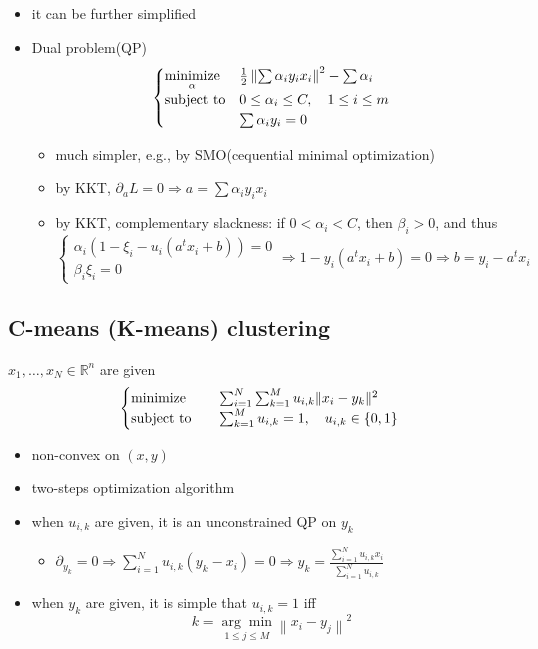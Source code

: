 \begin{remark}
\begin{itemize}
        \item it can be further simplified
        \item Dual problem(QP)\[\begin{cases}
            \underset{\alpha}{\operatorname{minimize}} & \frac{1}{2}\left\|\sum \alpha_{i} y_{i} x_{i}\right\|^{2}-\sum \alpha_{i} \\
            \operatorname{subject\ to} & 0 \leq \alpha_{i} \leq C, \quad 1 \leq i \leq m \\
            & \sum \alpha_{i} y_{i}=0
        \end{cases}\]\begin{itemize}
            \item much simpler, e.g., by SMO(cequential minimal optimization)
            \item by KKT, $\partial_aL = 0 \Longrightarrow a = \sum \alpha_iy_ix_i$
            \item by KKT, complementary slackness: if $0 < \alpha_i < C$, then $\beta_i > 0$, and thus \[\begin{cases}
                \alpha_i(1 - \xi_i - u_i(a^tx_i + b)) = 0\\
                \beta_i\xi_i = 0
            \end{cases} \Longrightarrow 1-y_{i}\left(a^{t} x_{i}+b\right)=0 \Longrightarrow b=y_{i}-a^{t} x_{i}\]
        \end{itemize}
    \end{itemize}
\end{remark}

\subsection{C-means (K-means) clustering}
\begin{remark}
    $x_1, \dots, x_N \in \mathbb{R}^n$ are given\[\begin{cases}
        \operatorname{minimize} \quad &\sum_{i = 1}^N\sum_{k = 1}^M u_{i, k}\|x_i - y_k\|^2\\
        \operatorname{subject\ to} \quad &\sum_{k = 1}^M u_{i, k} = 1, \quad u_{i, k} \in \left\{0, 1\right\}
    \end{cases}\]
    \begin{itemize}
        \item non-convex on $(x, y)$
        \item two-steps optimization algorithm
        \item when $u_{i, k}$ are given, it is an unconstrained QP on $y_k$\begin{itemize}
            \item $\partial_{y_{k}}=0 \Longrightarrow \sum_{i=1}^{N} u_{i, k}\left(y_{k}-x_{i}\right)=0 \Longrightarrow y_{k}=\frac{\sum_{i=1}^{N} u_{i, k} x_{i}}{\sum_{i=1}^{N} u_{i, k}}$
        \end{itemize}
        \item when $y_k$ are given, it is simple that $u_{i, k} = 1$ iff\[k=\underset{1 \leq j \leq M}{\arg \min }\left\|x_{i}-y_{j}\right\|^{2}\]
    \end{itemize}
\end{remark}

